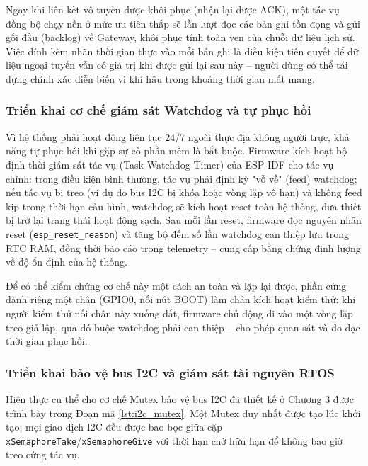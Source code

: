 Ngay khi liên kết vô tuyến được khôi phục (nhận lại được ACK), một tác vụ đồng bộ chạy nền ở mức ưu tiên thấp sẽ lần lượt đọc các bản ghi tồn đọng và gửi gối đầu (backlog) về Gateway, khôi phục tính toàn vẹn của chuỗi dữ liệu lịch sử. Việc đính kèm nhãn thời gian thực vào mỗi bản ghi là điều kiện tiên quyết để dữ liệu ngoại tuyến vẫn có giá trị khi được gửi lại sau này -- người dùng có thể tái dựng chính xác diễn biến vi khí hậu trong khoảng thời gian mất mạng.


\subsubsection{Triển khai cơ chế giám sát Watchdog và tự phục hồi}
Vì hệ thống phải hoạt động liên tục 24/7 ngoài thực địa không người trực, khả năng tự phục hồi khi gặp sự cố phần mềm là bắt buộc. Firmware kích hoạt bộ định thời giám sát tác vụ (Task Watchdog Timer) của ESP-IDF cho tác vụ chính: trong điều kiện bình thường, tác vụ phải định kỳ "vỗ về" (feed) watchdog; nếu tác vụ bị treo (ví dụ do bus I2C bị khóa hoặc vòng lặp vô hạn) và không feed kịp trong thời hạn cấu hình, watchdog sẽ kích hoạt reset toàn hệ thống, đưa thiết bị trở lại trạng thái hoạt động sạch. Sau mỗi lần reset, firmware đọc nguyên nhân reset (\texttt{esp\_reset\_reason}) và tăng bộ đếm số lần watchdog can thiệp lưu trong RTC RAM, đồng thời báo cáo trong telemetry -- cung cấp bằng chứng định lượng về độ ổn định của hệ thống.

Để có thể kiểm chứng cơ chế này một cách an toàn và lặp lại được, phần cứng dành riêng một chân (GPIO0, nối nút BOOT) làm chân kích hoạt kiểm thử: khi người kiểm thử nối chân này xuống đất, firmware chủ động đi vào một vòng lặp treo giả lập, qua đó buộc watchdog phải can thiệp -- cho phép quan sát và đo đạc thời gian phục hồi.

\subsubsection{Triển khai bảo vệ bus I2C và giám sát tài nguyên RTOS}
Hiện thực cụ thể cho cơ chế Mutex bảo vệ bus I2C đã thiết kế ở Chương 3 được trình bày trong Đoạn mã \ref{lst:i2c_mutex}. Một Mutex duy nhất được tạo lúc khởi tạo; mọi giao dịch I2C đều được bao bọc giữa cặp \texttt{xSemaphoreTake}/\texttt{xSemaphoreGive} với thời hạn chờ hữu hạn để không bao giờ treo cứng tác vụ.

